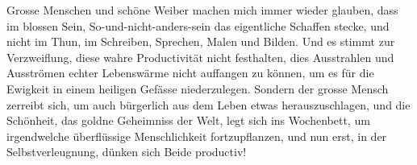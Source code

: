 Grosse Menschen und schöne Weiber machen mich immer wieder glauben, dass im blossen Sein, So-und-nicht-anders-sein das eigentliche Schaffen stecke, und nicht im Thun, im Schreiben, Sprechen, Malen und Bilden. Und es stimmt zur Verzweiflung, diese wahre Productivität nicht festhalten, dies Ausstrahlen und Ausströmen echter Lebenswärme nicht auffangen zu können, um es für die Ewigkeit in einem heiligen Gefässe niederzulegen. Sondern der grosse Mensch zerreibt sich, um auch bürgerlich aus dem Leben etwas herauszuschlagen, und die Schönheit, das goldne Geheimniss der Welt, legt sich ins Wochenbett, um irgendwelche überflüssige Menschlichkeit fortzupflanzen, und nun erst, in der Selbstverleugnung, dünken sich Beide productiv!
\par

